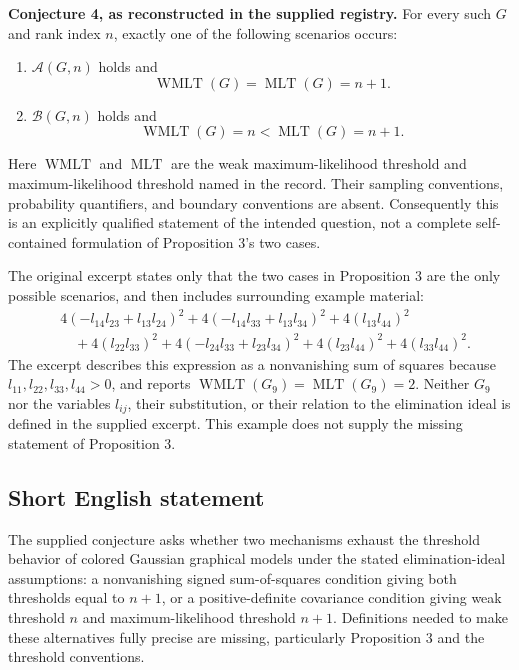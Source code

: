 \documentclass[11pt]{article}
\begin{document}
\textbf{Conjecture 4, as reconstructed in the supplied registry.}
For every such \(G\) and rank index \(n\), exactly one of the following scenarios occurs:
\begin{enumerate}
\item \(\mathcal A(G,n)\) holds and
\[
\operatorname{WMLT}(G)=\operatorname{MLT}(G)=n+1.
\]
\item \(\mathcal B(G,n)\) holds and
\[
\operatorname{WMLT}(G)=n<\operatorname{MLT}(G)=n+1.
\]
\end{enumerate}
Here \(\operatorname{WMLT}\) and \(\operatorname{MLT}\) are the weak maximum-likelihood threshold and maximum-likelihood threshold named in the record. Their sampling conventions, probability quantifiers, and boundary conventions are absent. Consequently this is an explicitly qualified statement of the intended question, not a complete self-contained formulation of Proposition 3's two cases.

The original excerpt states only that the two cases in Proposition 3 are the only possible scenarios, and then includes surrounding example material:
\[
\begin{aligned}
&4(-l_{14}l_{23}+l_{13}l_{24})^2
+4(-l_{14}l_{33}+l_{13}l_{34})^2
+4(l_{13}l_{44})^2\\
&\quad+4(l_{22}l_{33})^2
+4(-l_{24}l_{33}+l_{23}l_{34})^2
+4(l_{23}l_{44})^2
+4(l_{33}l_{44})^2.
\end{aligned}
\]
The excerpt describes this expression as a nonvanishing sum of squares because \(l_{11},l_{22},l_{33},l_{44}>0\), and reports \(\operatorname{WMLT}(G_9)=\operatorname{MLT}(G_9)=2\). Neither \(G_9\) nor the variables \(l_{ij}\), their substitution, or their relation to the elimination ideal is defined in the supplied excerpt. This example does not supply the missing statement of Proposition 3.
\subsection{Short English statement}
The supplied conjecture asks whether two mechanisms exhaust the threshold behavior of colored Gaussian graphical models under the stated elimination-ideal assumptions: a nonvanishing signed sum-of-squares condition giving both thresholds equal to \(n+1\), or a positive-definite covariance condition giving weak threshold \(n\) and maximum-likelihood threshold \(n+1\). Definitions needed to make these alternatives fully precise are missing, particularly Proposition 3 and the threshold conventions.
\end{document}
